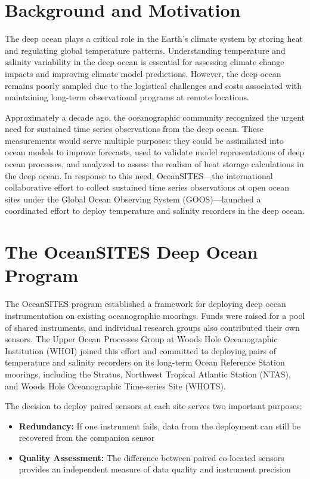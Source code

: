 \section{Background and Motivation}

The deep ocean plays a critical role in the Earth's climate system by storing heat and regulating global temperature patterns. Understanding temperature and salinity variability in the deep ocean is essential for assessing climate change impacts and improving climate model predictions. However, the deep ocean remains poorly sampled due to the logistical challenges and costs associated with maintaining long-term observational programs at remote locations.

Approximately a decade ago, the oceanographic community recognized the urgent need for sustained time series observations from the deep ocean. These measurements would serve multiple purposes: they could be assimilated into ocean models to improve forecasts, used to validate model representations of deep ocean processes, and analyzed to assess the realism of heat storage calculations in the deep ocean. In response to this need, OceanSITES—the international collaborative effort to collect sustained time series observations at open ocean sites under the Global Ocean Observing System (GOOS)—launched a coordinated effort to deploy temperature and salinity recorders in the deep ocean.

\section{The OceanSITES Deep Ocean Program}

The OceanSITES program established a framework for deploying deep ocean instrumentation on existing oceanographic moorings. Funds were raised for a pool of shared instruments, and individual research groups also contributed their own sensors. The Upper Ocean Processes Group at Woods Hole Oceanographic Institution (WHOI) joined this effort and committed to deploying pairs of temperature and salinity recorders on its long-term Ocean Reference Station moorings, including the Stratus, Northwest Tropical Atlantic Station (NTAS), and Woods Hole Oceanographic Time-series Site (WHOTS).

The decision to deploy paired sensors at each site serves two important purposes:
\begin{itemize}
    \item \textbf{Redundancy:} If one instrument fails, data from the deployment can still be recovered from the companion sensor
    \item \textbf{Quality Assessment:} The difference between paired co-located sensors provides an independent measure of data quality and instrument precision
\end{itemize}


